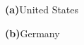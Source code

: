 \renewcommand{\arraystretch}{1.5}
\begin{multicols}{2}
	

	{\vspace*{6pt}\small \textbf{\textsf{(a)}}\quad United States}\vspace*{6pt}
	\newpage
	
	
	{\vspace*{6pt}\small \textbf{\textsf{(b)}}\quad Germany}
\end{multicols}
